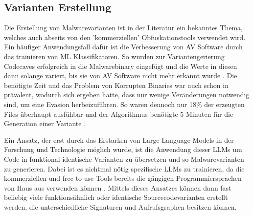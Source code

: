 \subsection{Varianten Erstellung}
Die Erstellung von Malwarevarianten ist in der Literatur ein bekanntes Thema, welches auch abseits von den 'kommerziellen' Obfuskationstools verwendet wird. Ein häufiger Anwendungsfall dafür ist die Verbesserung von AV Software durch das trainieren von ML Klassifikatoren\cite{phan_2022_leveraging}. So wurden zur Variantengerierung Codecaves erfolgreich in die Malwarebinary eingefügt und die Werte in diesen dann solange variert, bis sie von AV Software nicht mehr erkannt wurde \cite{yuste_2022_optimization}. Die benötigte Zeit und das Problem von Korrupten Binaries war auch schon in \cite{castro_2019_armed} prävalent, wodurch sich ergeben hatte, dass nur wenige Veränderungen notwendig sind, um eine Evasion herbeizuführen. So waren dennoch nur 18\% der erzeugten Files überhaupt ausfühbar und der Algorithmus benötigte 5 Minuten für die Generation einer Variante \cite{castro_2019_armed}.

Ein Ansatz, der erst durch das Erstarken von Large Language Models in der Forschung und Technologie möglich wurde, ist die Anwendung dieser LLMs um Code in funktional identische Varianten zu übersetzen und so Malwarevarianten zu generieren. Dabei ist es nichtmal nötig spezifische LLMs zu trainieren, da die kommerziellen und free to use Tools bereits die  gängigen Programmiersprachen von Haus aus verwenden können \cite{madani_2023_metamorphic}. Mittels dieses Ansatzes können dann fast beliebig viele funktionsähnlich oder identische Sourcecodevarianten erstellt werden, die unterschiedliche Signaturen und Aufrufsgraphen besitzen können.

